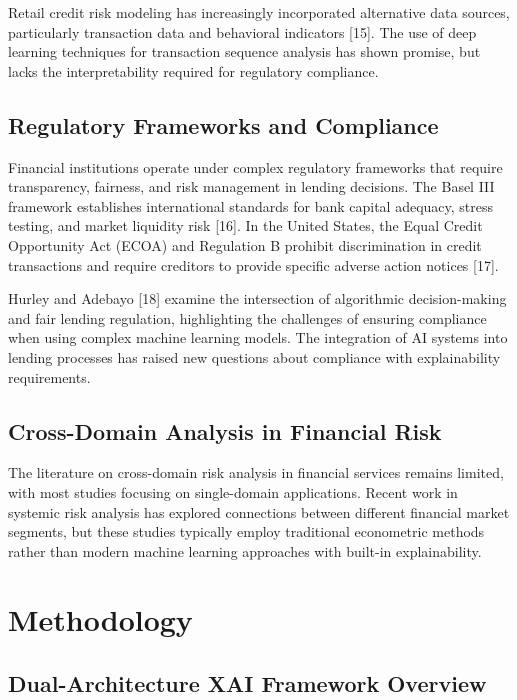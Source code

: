 \documentclass[a4 paper, 11pt,twoside]{article}
\newcommand{\0}{\Bf{0}}
\theoremstyle{definition}
\begin{document}
Retail credit risk modeling has increasingly incorporated alternative data sources, particularly transaction data and behavioral indicators [15]. The use of deep learning techniques for transaction sequence analysis has shown promise, but lacks the interpretability required for regulatory compliance.

\subsection{Regulatory Frameworks and Compliance}

Financial institutions operate under complex regulatory frameworks that require transparency, fairness, and risk management in lending decisions. The Basel III framework establishes international standards for bank capital adequacy, stress testing, and market liquidity risk [16]. In the United States, the Equal Credit Opportunity Act (ECOA) and Regulation B prohibit discrimination in credit transactions and require creditors to provide specific adverse action notices [17].

Hurley and Adebayo [18] examine the intersection of algorithmic decision-making and fair lending regulation, highlighting the challenges of ensuring compliance when using complex machine learning models. The integration of AI systems into lending processes has raised new questions about compliance with explainability requirements.

\subsection{Cross-Domain Analysis in Financial Risk}

The literature on cross-domain risk analysis in financial services remains limited, with most studies focusing on single-domain applications. Recent work in systemic risk analysis has explored connections between different financial market segments, but these studies typically employ traditional econometric methods rather than modern machine learning approaches with built-in explainability.
\section{Methodology}

\subsection{Dual-Architecture XAI Framework Overview}
\end{document}
